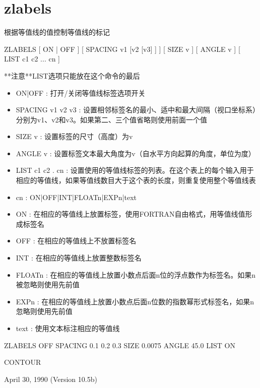 \section{zlabels}
\label{cmd:zlabels}

根据等值线的值控制等值线的标记

ZLABELS  [ ON | OFF ] [ SPACING v1 [v2 [v3] ] ] [ SIZE v ] [ ANGLE v ] [ LIST c1 c2 ... cn ]

**注意**LIST选项只能放在这个命令的最后

\begin{itemize}
\item ON|OFF : 打开/关闭等值线标签选项开关 
\item SPACING v1 v2 v3 : 设置相邻标签名的最小、适中和最大间隔（视口坐标系）分别为v1、v2和v3。如果第二、三个值省略则使用前面一个值 
\item SIZE v : 设置标签的尺寸（高度）为v 
\item ANGLE v : 设置标签文本最大角度为v（自水平方向起算的角度，单位为度） 
\item LIST c1 c2 . cn : 设置使用的等值线标签的列表。在这个表上的每个输入用于相应的等值线，如果等值线数目大于这个表的长度，则重复使用整个等值线表 
\item cn :  ON|OFF|INT|FLOATn|EXPn|text 
\item ON : 在相应的等值线上放置标签，使用FORTRAN自由格式，用等值线值形成标签名 
\item OFF : 在相应的等值线上不放置标签名 
\item INT : 在相应的等值线上放置整数标签名 
\item FLOATn : 在相应的等值线上放置小数点后面n位的浮点数作为标签名。如果n被忽略则使用先前值 
\item EXPn : 在相应的等值线上放置小数点后面n位数的指数幂形式标签名，如果n忽略则使用先前值 
\item text : 使用文本标注相应的等值线 
\end{itemize}

ZLABELS  OFF  SPACING 0.1 0.2 0.3  SIZE  0.0075 ANGLE 45.0  LIST ON

CONTOUR

April 30, 1990 (Version 10.5b)
